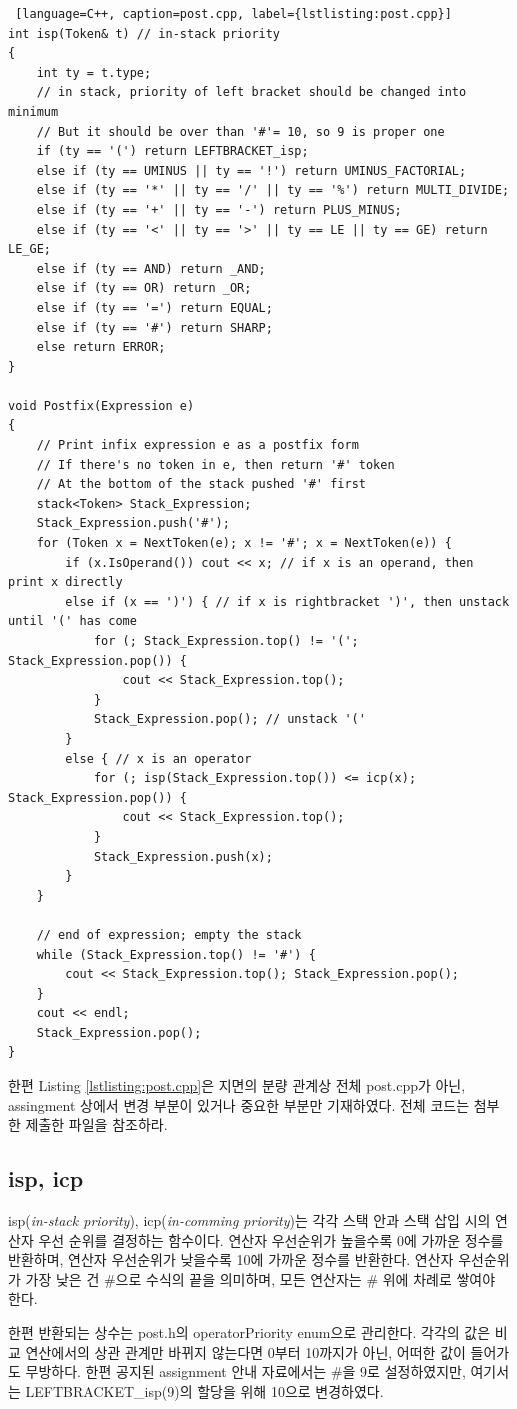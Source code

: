 \documentclass{article}
\begin{document}
\begin{lstlisting} [language=C++, caption=post.cpp, label={lstlisting:post.cpp}]
int isp(Token& t) // in-stack priority
{
	int ty = t.type;
	// in stack, priority of left bracket should be changed into minimum
	// But it should be over than '#'= 10, so 9 is proper one
	if (ty == '(') return LEFTBRACKET_isp;
	else if (ty == UMINUS || ty == '!') return UMINUS_FACTORIAL;
	else if (ty == '*' || ty == '/' || ty == '%') return MULTI_DIVIDE;
	else if (ty == '+' || ty == '-') return PLUS_MINUS;
	else if (ty == '<' || ty == '>' || ty == LE || ty == GE) return LE_GE;
	else if (ty == AND) return _AND;
	else if (ty == OR) return _OR;
	else if (ty == '=') return EQUAL;
	else if (ty == '#') return SHARP;
	else return ERROR;
}

void Postfix(Expression e)
{
	// Print infix expression e as a postfix form
	// If there's no token in e, then return '#' token
	// At the bottom of the stack pushed '#' first
	stack<Token> Stack_Expression;
	Stack_Expression.push('#');
	for (Token x = NextToken(e); x != '#'; x = NextToken(e)) {
		if (x.IsOperand()) cout << x; // if x is an operand, then print x directly
		else if (x == ')') { // if x is rightbracket ')', then unstack until '(' has come
			for (; Stack_Expression.top() != '('; Stack_Expression.pop()) {
				cout << Stack_Expression.top();
			}
			Stack_Expression.pop(); // unstack '('
		}
		else { // x is an operator
			for (; isp(Stack_Expression.top()) <= icp(x); Stack_Expression.pop()) {
				cout << Stack_Expression.top();
			}
			Stack_Expression.push(x);
		}
	}

	// end of expression; empty the stack
	while (Stack_Expression.top() != '#') {
		cout << Stack_Expression.top(); Stack_Expression.pop();
	}
	cout << endl; 
	Stack_Expression.pop();
}
\end{lstlisting}
한편 Listing \ref{lstlisting:post.cpp}은 지면의 분량 관계상 전체 post.cpp가 아닌, assingment 상에서 변경 부분이 있거나 중요한 부분만 기재하였다. 전체 코드는 첨부한 제출한 파일을 참조하라.
\subsection{isp, icp}
isp(\textit{in-stack priority}), icp(\textit{in-comming priority})는 각각 스택 안과 스택 삽입 시의 연산자 우선 순위를 결정하는 함수이다. 연산자 우선순위가 높을수록 0에 가까운 정수를 반환하며, 연산자 우선순위가 낮을수록 10에 가까운 정수를 반환한다. 연산자 우선순위가 가장 낮은 건 \#으로 수식의 끝을 의미하며, 모든 연산자는 \# 위에 차례로 쌓여야 한다.

한편 반환되는 상수는 post.h의 operatorPriority enum으로 관리한다. 각각의 값은 비교 연산에서의 상관 관계만 바뀌지 않는다면 0부터 10까지가 아닌, 어떠한 값이 들어가도 무방하다. 한편 공지된 assignment 안내 자료에서는 \#을 9로 설정하였지만, 여기서는 LEFTBRACKET\_isp(9)의 할당을 위해 10으로 변경하였다.
\end{document}

